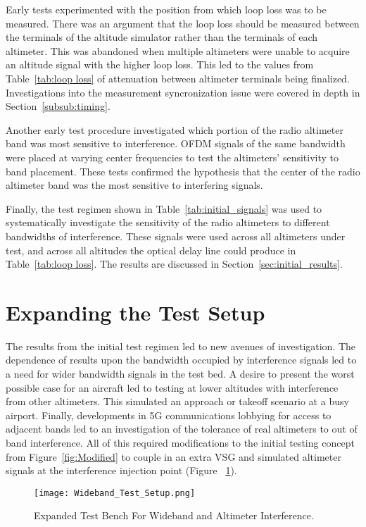 Early tests experimented with the position from which loop loss was to be measured. There was an argument that the loop loss should be measured between the terminals of the altitude simulator rather than the terminals of each altimeter. This was abandoned when multiple altimeters were unable to acquire an altitude signal with the higher loop loss. This led to the values from Table~\ref{tab:loop loss} of attenuation between altimeter terminals being finalized. Investigations into the measurement syncronization issue were covered in depth in Section~\ref{subsub:timing}.

 Another early test procedure investigated which portion of the radio altimeter band was most sensitive to interference. OFDM signals of the same bandwidth were placed at varying center frequencies to test the altimeters' sensitivity to band placement. These tests confirmed the hypothesis that the center of the radio altimeter band was the most sensitive to interfering signals. 

Finally, the test regimen shown in Table~\ref{tab:initial_signals} was used to systematically investigate the sensitivity of the radio altimeters to different bandwidths of interference. These signals were used across all altimeters under test, and across all altitudes the optical delay line could produce in Table~\ref{tab:loop loss}. The results are discussed in Section~\ref{sec:initial_results}.

\section{Expanding the Test Setup}\label{sec:expanding}
The results from the initial test regimen led to new avenues of investigation. The dependence of results upon the bandwidth occupied by interference signals led to a need for wider bandwidth signals in the test bed. A desire to present the worst possible case for an aircraft led to testing at lower altitudes with interference from other altimeters. This simulated an approach or takeoff scenario at a busy airport. Finally, developments in 5G communications lobbying for access to adjacent bands led to an investigation of the tolerance of real altimeters to out of band interference. All of this required modifications to the initial testing concept from Figure~\ref{fig:Modified} to couple in an extra VSG and simulated altimeter signals at the interference injection point (Figure ~\ref{fig:Wideband}).
\begin{figure}[ht]
\centering

\texttt{[image: Wideband\_Test\_Setup.png]}
\caption{Expanded Test Bench For Wideband and Altimeter Interference.}

\label{fig:Wideband}

\end{figure}
